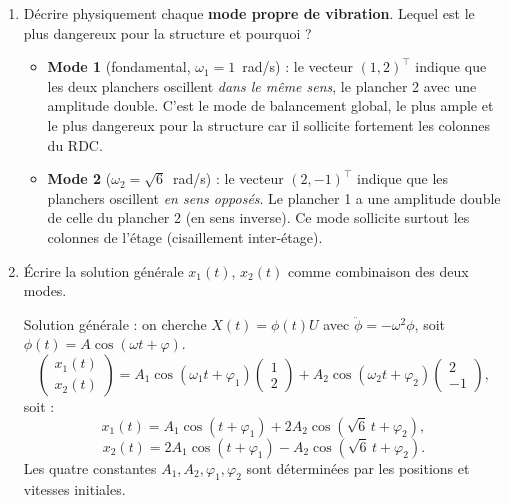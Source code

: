 \begin{enumerate}[itemsep=2em]
\begin{enumerate}[label=\alph*), itemsep=0.6em]
\begin{solution}
Périodes : $T_1 = 2\pi \approx 6{,}28\;\mathrm{s}$, $T_2 = 2\pi/\sqrt{6} \approx 2{,}57\;\mathrm{s}$.
\end{solution}

  \item Décrire physiquement chaque \textbf{mode propre de vibration}. Lequel est le plus dangereux pour la structure et pourquoi ?

\begin{solution}
\begin{itemize}[nosep]
  \item \textbf{Mode 1} (fondamental, $\omega_1 = 1$~rad/s) : le vecteur $(1,2)^\top$ indique que les deux planchers oscillent \emph{dans le même sens}, le plancher 2 avec une amplitude double. C'est le mode de balancement global, le plus ample et le plus dangereux pour la structure car il sollicite fortement les colonnes du RDC.
  \item \textbf{Mode 2} ($\omega_2 = \sqrt{6}$~rad/s) : le vecteur $(2,-1)^\top$ indique que les planchers oscillent \emph{en sens opposés}. Le plancher 1 a une amplitude double de celle du plancher 2 (en sens inverse). Ce mode sollicite surtout les colonnes de l'étage (cisaillement inter-étage).
\end{itemize}
\end{solution}

  \item Écrire la solution générale $x_1(t)$, $x_2(t)$ comme combinaison des deux modes.

\begin{solution}
Solution générale : on cherche $X(t) = \phi(t) U$ avec $\ddot{\phi} = -\omega^2 \phi$, soit $\phi(t) = A\cos(\omega t + \varphi)$.
\[
\begin{pmatrix} x_1(t) \\ x_2(t) \end{pmatrix}
= A_1 \cos(\omega_1 t + \varphi_1) \begin{pmatrix} 1 \\ 2 \end{pmatrix}
+ A_2 \cos(\omega_2 t + \varphi_2) \begin{pmatrix} 2 \\ -1 \end{pmatrix},
\]
soit :
\[
  x_1(t) = A_1\cos(t + \varphi_1) + 2A_2\cos(\sqrt{6}\,t + \varphi_2),
\]
\[
  x_2(t) = 2A_1\cos(t + \varphi_1) - A_2\cos(\sqrt{6}\,t + \varphi_2).
\]
Les quatre constantes $A_1, A_2, \varphi_1, \varphi_2$ sont déterminées par les positions et vitesses initiales.
\end{solution}
\end{enumerate}

\end{enumerate}


